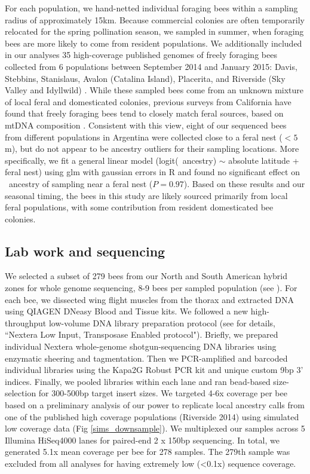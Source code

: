 For each population, we hand-netted individual foraging bees within a sampling radius of approximately 15km. Because commercial colonies are often temporarily relocated for the spring pollination season, we sampled in summer, when foraging bees are more likely to come from resident populations. We additionally included in our analyses 35 high-coverage published genomes of freely foraging bees collected from 6 populations between September 2014 and January 2015: Davis, Stebbins, Stanislaus, Avalon (Catalina Island), Placerita, and Riverside (Sky Valley and Idyllwild) \cite{Cridland:2018fx}.
While these sampled bees come from an unknown mixture of local feral and domesticated colonies, previous surveys from California have found that freely foraging bees tend to closely match feral sources, based on mtDNA composition \cite{Kono:2015fi}. Consistent with this view, eight of our sequenced bees from different populations in Argentina were collected close to a feral nest ($<5$m), but do not appear to be ancestry outliers for their sampling locations. More specifically, we fit a general linear model (logit(\A\ ancestry) $\sim$ absolute latitude + feral nest) using glm with gaussian errors in R and found no significant effect on \A\ ancestry of sampling near a feral nest ($P = 0.97$). Based on these results and our seasonal timing, the bees in this study are likely sourced primarily from local feral populations, with some contribution from resident domesticated bee colonies.

\subsection*{Lab work and sequencing}
We selected a subset of 279 bees from our North and South American hybrid zones for whole genome sequencing, 8-9 bees per sampled population (see ). For each bee, we dissected wing flight muscles from the thorax and extracted DNA using QIAGEN DNeasy Blood and Tissue kits. We followed a new high-throughput low-volume DNA library preparation protocol (see \cite{Rowan:2019} for details, “Nextera Low Input, Transposase Enabled protocol"). Briefly, we prepared individual Nextera whole-genome shotgun-sequencing DNA libraries using enzymatic sheering and tagmentation. Then we PCR-amplified and barcoded individual libraries using the Kapa2G Robust PCR kit and unique custom 9bp 3’ indices. Finally, we pooled libraries within each lane and ran bead-based size-selection for 300-500bp target insert sizes. We targeted 4-6x coverage per bee based on a preliminary analysis of our power to replicate local ancestry calls from one of the published high coverage populations (Riverside 2014) using simulated low coverage data (Fig \ref{sims_downsample}). We multiplexed our samples across 5 Illumina HiSeq4000 lanes for paired-end 2 x 150bp sequencing. In total, we generated 5.1x mean coverage per bee for 278 samples. The 279th sample was excluded from all analyses for having extremely low (\textless 0.1x) sequence coverage.


